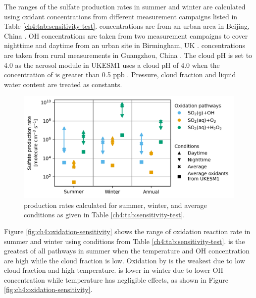 The ranges of the sulfate production rates in summer and winter are calculated using oxidant concentrations from different measurement campaigns listed in Table \ref{ch4:tab:sensitivity-test}.  concentrations are from an urban area in Beijing, China \citep{linCharacteristicsRecentTrends2012}. OH concentrations are taken from two measurement campaigns to cover nighttime and daytime from an urban site in Birmingham, UK \citep{heardHighLevelsHydroxyl2004, khanNighttimeNO3OH2008}.  concentrations are taken from rural measurements in Guangzhou, China \citep{huaAtmosphericHydrogenPeroxide2008}. The cloud pH is set to 4.0 as the aerosol module in UKESM1 uses a cloud pH of 4.0 when the concentration of  is greater than 0.5 ppb \citep{mannDescriptionEvaluationGLOMAPmode2010}. Pressure, cloud fraction and liquid water content are treated as constants.

\begin{figure}
    \centering
    \includegraphics{Chapter4/Figs/theoretical_oxidation.png}
    \caption[ production rates calculated for summer, winter, and average conditions]{ production rates calculated for summer, winter, and average conditions as given in Table \ref{ch4:tab:sensitivity-test}.}
    \label{fig:ch4:sensitivity-summary}
\end{figure}

Figure \ref{fig:ch4:oxidation-sensitivity} shows the range of  oxidation reaction rate in summer and winter using conditions from Table \ref{ch4:tab:sensitivity-test}.  is the greatest of all pathways in summer when the temperature and OH concentration are high while the cloud fraction is low. Oxidation by  is the weakest due to low cloud fraction and high temperature.  is lower in winter due to lower OH concentration while temperature has negligible effects, as shown in Figure \ref{fig:ch4:oxidation-sensitivity}. 

